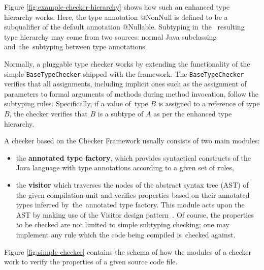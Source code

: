 \documentclass{pracamgr}
\theoremstyle{break}
\theoremstyle{break}
\theoremstyle{break}
\begin{document}
Figure \ref{fig:example-checker-hierarchy} shows how such an enhanced
type hierarchy works. Here, the type annotation @NonNull is defined to
be a subqualifier of the default annotation @Nullable. Subtyping
in~the~ resulting type hierarchy may come from two sources: normal
Java subclassing and~the~subtyping between type annotations.

Normally, a pluggable type checker works by extending the
functionality of the simple \texttt{BaseTypeChecker} shipped with the
framework. The \texttt{BaseTypeChecker} verifies that all assignments,
including implicit ones such as the assignment of parameters to formal
arguments of methods during method invocation, follow the subtyping
rules. Specifically, if a value of~type $B$ is assigned to a reference
of type $B$, the checker verifies that $B$ is a subtype of $A$ as per
the enhanced type hierarchy.

A checker based on the Checker Framework usually consists of two main
modules:
\begin{itemize}
\item the \textbf{annotated type factory}, which provides syntactical
  constructs of the Java language with type annotations according to a
  given set of rules,
\item the \textbf{visitor} which traverses the nodes of the abstract
  syntax tree (AST) of the given compilation unit and verifies
  properties based on their annotated types inferred by~the~annotated
  type factory. This module acts upon the AST by making use of the
  Visitor design pattern~\cite{visitor1, visitor2}. Of course, the properties to
  be checked are not limited to simple subtyping checking; one may
  implement any rule which the code being compiled is~checked
  against.
\end{itemize}
Figure \ref{fig:simple-checker} contains the schema of how the modules
of a checker work to verify the properties of a given source code
file.
\end{document}
